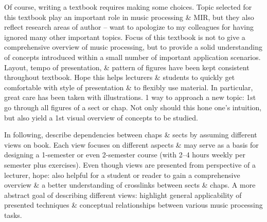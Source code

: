 \documentclass{article}
\begin{document}
\begin{itemize}
\begin{itemize}
		Of course, writing a textbook requires making some choices. Topic selected for this textbook play an important role in music processing \& MIR, but they also reflect research areas of author -- want to apologize to my colleagues for having ignored many other important topics. Focus of this textbook is not to give a comprehensive overview of music processing, but to provide a solid understanding of concepts introduced within a small number of important application scenarios. Layout, tempo of presentation, \& pattern of figures have been kept consistent throughout textbook. Hope this helps lecturers \& students to quickly get comfortable with style of presentation \& to flexibly use material. In particular, great care has been taken with illustrations. 1 way to approach a new topic: 1st go through all figures of a sect or chap. Not only should this hone one's intuition, but also yield a 1st visual overview of concepts to be studied.
		
		In following, describe dependencies between chaps \& sects by assuming different views on book. Each view focuses on different aspects \& may serve as a basis for designing a 1-semester or even 2-semester course (with 2--4 hours weekly per semester plus exercises). Even though views are presented from perspective of a lecturer, hope: also helpful for a student or reader to gain a comprehensive overview \& a better understanding of crosslinks between sects \& chaps. A more abstract goal of describing different views: highlight general applicability of presented techniques \& conceptual relationships between various music processing tasks.
		

\end{itemize}
\end{itemize}
\end{document}
